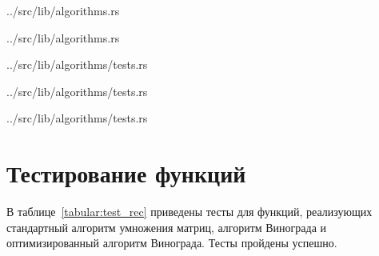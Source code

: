 \begin{lstinputlisting}[
	caption={Оптимизированный алгоритм Копперсмита — Винограда},
	label={lst:vino_improved},
	style={rustlang},
	linerange={115-145}
]{../src/lib/algorithms.rs}
\end{lstinputlisting}

\begin{lstinputlisting}[
	caption={Функции оптимизированного алгоритма Копперсмита — Винограда},
	label={lst:fast_subroutines},
	style={rustlang},
	linerange={57-79}
]{../src/lib/algorithms.rs}
\end{lstinputlisting}

\begin{lstinputlisting}[
	caption={Пример написания теста для алгоритмов},
	label={lst:tests},
	style={rustlang},
	linerange={38-42}
]{../src/lib/algorithms/tests.rs}
\end{lstinputlisting}

\begin{lstinputlisting}[
	caption={Функция run\_check},
	label={lst:run_check},
	style={rustlang},
	linerange={27-36}
]{../src/lib/algorithms/tests.rs}
\end{lstinputlisting}

\begin{lstinputlisting}[
	caption={Пример написания бенчмарка для алгоритма},
	label={lst:benches},
	style={rustlang},
	linerange={57-61}
]{../src/lib/algorithms/tests.rs}
\end{lstinputlisting}


\section{Тестирование функций}

В таблице~\ref{tabular:test_rec} приведены тесты для функций, реализующих стандартный алгоритм умножения матриц, алгоритм Винограда и оптимизированный алгоритм Винограда. Тесты пройдены успешно.

